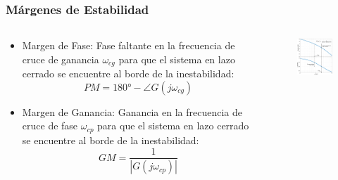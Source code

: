 \documentclass[aspectratio=169, handout]{beamer}
\theoremstyle{definition}
\theoremstyle{plain}
\theoremstyle{remark}
\begin{document}
\begin{frame}[<+->]\frametitle{Márgenes de Estabilidad}
	\small
	\begin{columns}
		\begin{column}{0.45\textwidth}
			\begin{itemize}
				\item Margen de Fase: Fase faltante en la frecuencia de cruce de ganancia $\omega_{cg}$ para que el sistema en lazo cerrado se encuentre al borde de la inestabilidad:
				\begin{equation*}
					PM = \ang{180} - \angle G(j\omega_{cg})
				\end{equation*}
				\item Margen de Ganancia: Ganancia en la frecuencia de cruce de fase $\omega_{cp}$ para que el sistema en lazo cerrado se encuentre al borde de la inestabilidad:
				\begin{equation*}
					GM = \frac{1}{|G(j\omega_{cp})|}
				\end{equation*}
			\end{itemize}
		\end{column}
		\begin{column}{0.55\textwidth}
		\begin{figure}
			\vspace*{-4mm}
			\centering
			\includegraphics[width=7cm]{images/phaseGainMarginsExample.eps}
		\end{figure}
		\end{column}
	\end{columns}	
\end{frame}
\end{document}
